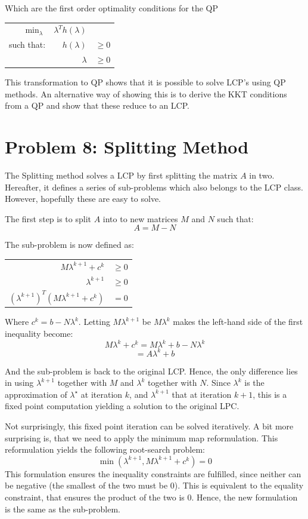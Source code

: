 \documentclass[10pt,oneside,a4paper,final,english]{memoir}
\begin{document}
Which are the first order optimality conditions for the QP
\begin{center}\begin{tabular}{rrl}
$\min_\lambda$ & $\lambda^T h(\lambda)$ & \\
such that: & $h(\lambda)$ & $\geq 0$ \\
           & $\lambda $ & $\geq 0$
\end{tabular}\end{center}

This transformation to QP shows that it is possible to solve LCP's
using QP methods. An alternative way of showing this is to derive the
KKT conditions from a QP and show that these reduce to an LCP.


\section{Problem 8: Splitting Method}
\label{splitting}
The Splitting method solves a LCP by first splitting the matrix $A$ in
two. Hereafter, it defines a series of sub-problems which also belongs
to the LCP class. However, hopefully these are easy to solve.

The first step is to split $A$ into to new matrices $M$ and $N$ such
that:
\[ A = M - N \]

The sub-problem is now defined as:
\begin{center}\begin{tabular}{rl}
$M\lambda^{k+1} + c^k$ & $\geq 0$ \\
$\lambda^{k+1}$ & $\geq 0$\\
$(\lambda^{k+1})^T (M\lambda^{k+1} + c^k)$ & $= 0$
\end{tabular}\end{center}

Where $c^k = b - N\lambda^k$. Letting $M\lambda^{k+1}$ be $M\lambda^k$
makes the left-hand side of the first inequality become:
\[ M \lambda^k + c^k = M\lambda^k + b - N\lambda^k \]
\[ = A\lambda^k + b\]

And the sub-problem is back to the original LCP. Hence, the only
difference lies in using $\lambda^{k+1}$ together with $M$ and
$\lambda^k$ together with $N$. Since $\lambda^k$ is the approximation
of $\lambda^\star$ at iteration $k$, and $\lambda^{k+1}$ that at
iteration $k+1$, this is a fixed point computation yielding a solution
to the original LPC.

Not surprisingly, this fixed point iteration can be solved
iteratively. A bit more surprising is, that we need to apply the
minimum map reformulation. This reformulation yields the following
root-search problem:
\[ \min (\lambda^{k+1}, M\lambda^{k+1} + c^k) = 0 \]
This formulation ensures the inequality constraints are fulfilled,
since neither can be negative (the smallest of the two must be
$0$). This is equivalent to the equality constraint, that ensures the
product of the two is $0$. Hence, the new formulation is the same
as the sub-problem.
\end{document}

